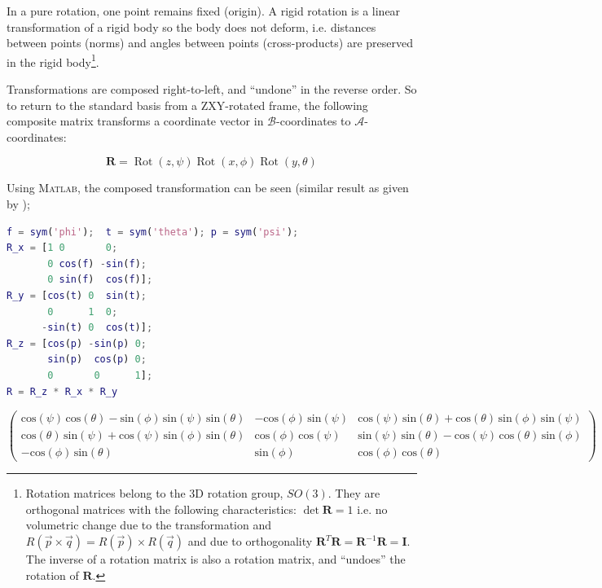 \documentclass[a4paper]{report}
\newcommand{\MATLAB}{\textsc{Matlab}}
\DeclareMathOperator{\Rot}{Rot}
\newcommand{\matr}[1]{\mathbf{#1}}
\begin{document}
In a pure rotation, one point remains fixed (origin). 
A rigid rotation is a linear transformation of a rigid body so the body does not deform, i.e. distances between points (norms) and angles between points (cross-products) are preserved in the rigid body\footnote{
Rotation matrices belong to the 3D rotation group, $SO(3)$. They are orthogonal matrices with the following characteristics: 
$\det{\matr{R}}=1$ i.e. no volumetric change due to the transformation and $R(\vec{p}\times\vec{q})=R(\vec{p}) \times R(\vec{q})$ and due to orthogonality $\matr{R}^T \matr{R} = \matr{R}^{-1} \matr{R} = \matr{I}$. The inverse of a rotation matrix is also a rotation matrix, and ``undoes'' the rotation of $\matr{R}$.
}. 

Transformations are composed right-to-left, and ``undone'' in the reverse order.
So to return to the standard basis from a ZXY-rotated frame, the following composite matrix transforms a coordinate vector in
$\mathcal{B}$-coordinates to $\mathcal{A}$-coordinates:

\begin{equation}
\matr{R}=\Rot(z, \psi)  \Rot(x, \phi) \Rot(y, \theta)
\end{equation}

Using \MATLAB, the composed transformation can be seen (similar result as given by \cite[p. 313]{Powers2015});
\begin{lstlisting}[language=Matlab, style=Matlab-editor]
 % roll (about b1 or x), pitch (about b2 or y), yaw (about b3 or z)
f = sym('phi');  t = sym('theta'); p = sym('psi'); 
R_x = [1 0       0; 
       0 cos(f) -sin(f);
       0 sin(f)  cos(f)];
R_y = [cos(t) 0  sin(t); 
       0      1  0; 
      -sin(t) 0  cos(t)];
R_z = [cos(p) -sin(p) 0; 
       sin(p)  cos(p) 0;
       0       0      1];
R = R_z * R_x * R_y
\end{lstlisting}

\begin{equation}
\left(\begin{array}{ccc}
\mathrm{cos}\left(\psi \right)\,\mathrm{cos}\left(\theta \right)-\mathrm{sin}\left(\phi \right)\,\mathrm{sin}\left(\psi \right)\,\mathrm{sin}\left(\theta \right) & -\mathrm{cos}\left(\phi \right)\,\mathrm{sin}\left(\psi \right) & \mathrm{cos}\left(\psi \right)\,\mathrm{sin}\left(\theta \right)+\mathrm{cos}\left(\theta \right)\,\mathrm{sin}\left(\phi \right)\,\mathrm{sin}\left(\psi \right)\\
\mathrm{cos}\left(\theta \right)\,\mathrm{sin}\left(\psi \right)+\mathrm{cos}\left(\psi \right)\,\mathrm{sin}\left(\phi \right)\,\mathrm{sin}\left(\theta \right) & \mathrm{cos}\left(\phi \right)\,\mathrm{cos}\left(\psi \right) & \mathrm{sin}\left(\psi \right)\,\mathrm{sin}\left(\theta \right)-\mathrm{cos}\left(\psi \right)\,\mathrm{cos}\left(\theta \right)\,\mathrm{sin}\left(\phi \right)\\
-\mathrm{cos}\left(\phi \right)\,\mathrm{sin}\left(\theta \right) & \mathrm{sin}\left(\phi \right) & \mathrm{cos}\left(\phi \right)\,\mathrm{cos}\left(\theta \right)
\end{array}\right)
\end{equation}
\end{document}
